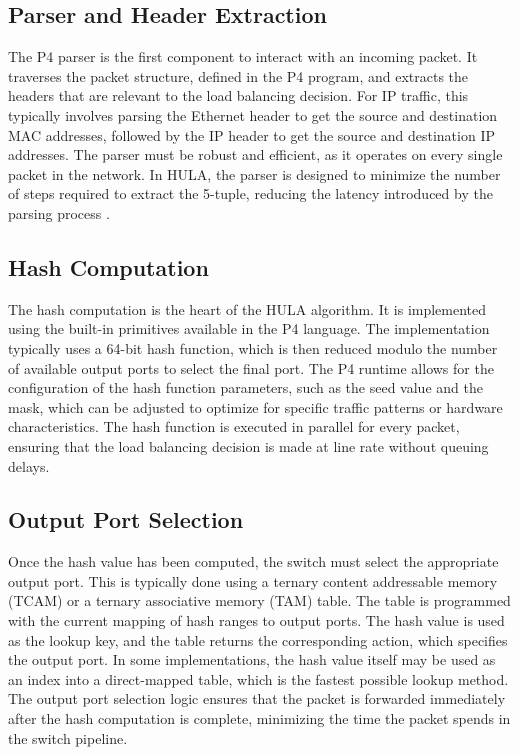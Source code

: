\documentclass[12pt,a4paper]{article}
\begin{document}
\subsection{Parser and Header Extraction}

The P4 parser is the first component to interact with an incoming packet. It traverses the packet structure, defined in the P4 program, and extracts the headers that are relevant to the load balancing decision. For IP traffic, this typically involves parsing the Ethernet header to get the source and destination MAC addresses, followed by the IP header to get the source and destination IP addresses. The parser must be robust and efficient, as it operates on every single packet in the network. In HULA, the parser is designed to minimize the number of steps required to extract the 5-tuple, reducing the latency introduced by the parsing process \cite{ref17}.

\subsection{Hash Computation}

The hash computation is the heart of the HULA algorithm. It is implemented using the built-in primitives available in the P4 language. The implementation typically uses a 64-bit hash function, which is then reduced modulo the number of available output ports to select the final port. The P4 runtime allows for the configuration of the hash function parameters, such as the seed value and the mask, which can be adjusted to optimize for specific traffic patterns or hardware characteristics. The hash function is executed in parallel for every packet, ensuring that the load balancing decision is made at line rate without queuing delays.

\subsection{Output Port Selection}

Once the hash value has been computed, the switch must select the appropriate output port. This is typically done using a ternary content addressable memory (TCAM) or a ternary associative memory (TAM) table. The table is programmed with the current mapping of hash ranges to output ports. The hash value is used as the lookup key, and the table returns the corresponding action, which specifies the output port. In some implementations, the hash value itself may be used as an index into a direct-mapped table, which is the fastest possible lookup method. The output port selection logic ensures that the packet is forwarded immediately after the hash computation is complete, minimizing the time the packet spends in the switch pipeline.
\end{document}
